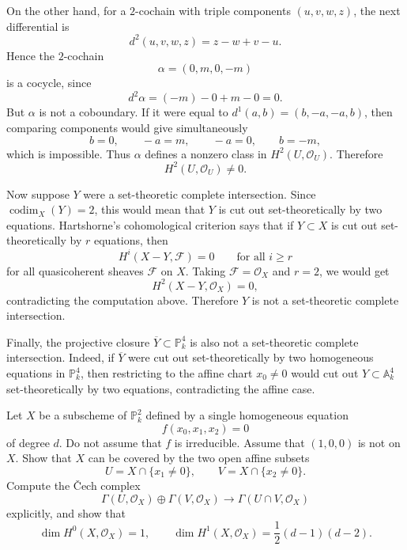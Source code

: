 \documentclass[12pt]{article}
\begin{document}
\begin{solution}
    On the other hand, for a $2$-cochain with triple components $(u,v,w,z)$, the next differential is
    \[
        d^2(u,v,w,z)=z-w+v-u.
    \]
    Hence the $2$-cochain
    \[
        \alpha=(0,m,0,-m)
    \]
    is a cocycle, since
    \[
        d^2\alpha=(-m)-0+m-0=0.
    \]
    But $\alpha$ is not a coboundary. If it were equal to $d^1(a,b)=(b,-a,-a,b)$, then comparing components would give simultaneously
    \[
        b=0,\qquad -a=m,\qquad -a=0,\qquad b=-m,
    \]
    which is impossible. Thus $\alpha$ defines a nonzero class in $H^2(U,\mathcal O_U)$. Therefore
    \[
        H^2(U,\mathcal O_U)\neq 0.
    \]

    Now suppose $Y$ were a set-theoretic complete intersection. Since $\operatorname{codim}_X(Y)=2$, this would mean that $Y$ is cut out set-theoretically by two equations. Hartshorne's cohomological criterion says that if $Y\subset X$ is cut out set-theoretically by $r$ equations, then
    \[
        H^i(X-Y,\mathcal F)=0
        \qquad
        \text{for all } i\ge r
    \]
    for all quasicoherent sheaves $\mathcal F$ on $X$. Taking $\mathcal F=\mathcal O_X$ and $r=2$, we would get
    \[
        H^2(X-Y,\mathcal O_X)=0,
    \]
    contradicting the computation above. Therefore $Y$ is not a set-theoretic complete intersection.

    Finally, the projective closure $\overline Y\subset \mathbb P^4_k$ is also not a set-theoretic complete intersection. Indeed, if $\overline Y$ were cut out set-theoretically by two homogeneous equations in $\mathbb P^4_k$, then restricting to the affine chart $x_0\neq 0$ would cut out $Y\subset \mathbb A^4_k$ set-theoretically by two equations, contradicting the affine case.
\end{solution}

\begin{exercise}
    Let $X$ be a subscheme of $\mathbb P^2_k$ defined by a single homogeneous equation
    \[
        f(x_0,x_1,x_2)=0
    \]
    of degree $d$. Do not assume that $f$ is irreducible. Assume that $(1,0,0)$ is not on $X$. Show that $X$ can be covered by the two open affine subsets
    \[
        U=X\cap \{x_1\neq 0\},
        \qquad
        V=X\cap \{x_2\neq 0\}.
    \]
    Compute the \v Cech complex
    \[
        \Gamma(U,\mathcal O_X)\oplus \Gamma(V,\mathcal O_X)
        \to
        \Gamma(U\cap V,\mathcal O_X)
    \]
    explicitly, and show that
    \[
        \dim H^0(X,\mathcal O_X)=1,
        \qquad
        \dim H^1(X,\mathcal O_X)=\frac{1}{2}(d-1)(d-2).
    \]
\end{exercise}
\end{document}
